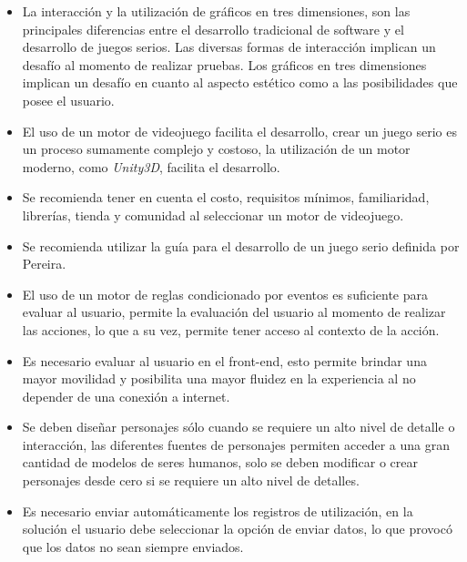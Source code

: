 \begin{itemize}
\item La interacción y la utilización de gráficos en tres dimensiones, son las
    principales diferencias entre el desarrollo tradicional de software y el desarrollo de
    juegos serios. Las diversas formas de interacción implican un desafío al 
    momento de realizar pruebas. Los gráficos en tres dimensiones implican un desafío
    en cuanto al aspecto estético como a las posibilidades que posee el
    usuario.

\item El uso de un motor de videojuego facilita el desarrollo, crear un juego
    serio es un proceso sumamente complejo y costoso, la utilización de un motor
    moderno, como \emph{Unity3D}, facilita el desarrollo. 
        
\item Se recomienda tener en cuenta el costo, requisitos mínimos, familiaridad,
    librerías, tienda y comunidad al seleccionar un motor de videojuego.

\item Se recomienda utilizar la guía para el desarrollo de un juego
        serio definida por Pereira\cite{pereira2009design}. 

\item El uso de un motor de reglas condicionado por eventos es suficiente para
    evaluar al usuario, permite la evaluación del usuario al momento de realizar
    las acciones, lo que a su vez, permite tener acceso al contexto de la
    acción. 

\item Es necesario evaluar al usuario en el front-end, esto  permite brindar una
    mayor movilidad y posibilita una mayor fluidez en la experiencia al no
    depender de una conexión a internet. 

\item Se deben diseñar personajes sólo cuando se requiere un alto nivel de
    detalle o interacción, las diferentes fuentes de personajes permiten acceder
    a una gran cantidad de modelos de seres humanos, solo se deben modificar o
    crear personajes desde cero si se requiere un alto nivel de detalles.

\item Es necesario enviar automáticamente los registros de utilización, en la
    solución el usuario debe seleccionar la opción de enviar datos, lo que
    provocó que los datos no sean siempre enviados.

\end{itemize}

